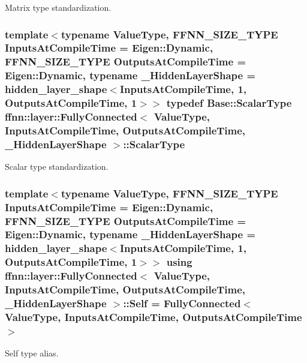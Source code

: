 Matrix type standardization. 

\hypertarget{classffnn_1_1layer_1_1_fully_connected_aa5e1875ec3ea63c90655419e7dd32a55}{
\subsubsection[{Scalar\-Type}]{\setlength{\rightskip}{0pt plus 5cm}template$<$typename Value\-Type, F\-F\-N\-N\-\_\-\-S\-I\-Z\-E\-\_\-\-T\-Y\-P\-E Inputs\-At\-Compile\-Time = Eigen\-::\-Dynamic, F\-F\-N\-N\-\_\-\-S\-I\-Z\-E\-\_\-\-T\-Y\-P\-E Outputs\-At\-Compile\-Time = Eigen\-::\-Dynamic, typename \-\_\-\-Hidden\-Layer\-Shape = hidden\-\_\-layer\-\_\-shape$<$\-Inputs\-At\-Compile\-Time, 1, Outputs\-At\-Compile\-Time, 1$>$$>$ typedef {\bf Base\-::\-Scalar\-Type} {\bf ffnn\-::layer\-::\-Fully\-Connected}$<$ Value\-Type, Inputs\-At\-Compile\-Time, Outputs\-At\-Compile\-Time, \-\_\-\-Hidden\-Layer\-Shape $>$\-::{\bf Scalar\-Type}}}\label{classffnn_1_1layer_1_1_fully_connected_aa5e1875ec3ea63c90655419e7dd32a55}


Scalar type standardization. 

\hypertarget{classffnn_1_1layer_1_1_fully_connected_ac41b1867a1a4e8c9c9eaa892db2ab805}{
\subsubsection[{Self}]{\setlength{\rightskip}{0pt plus 5cm}template$<$typename Value\-Type, F\-F\-N\-N\-\_\-\-S\-I\-Z\-E\-\_\-\-T\-Y\-P\-E Inputs\-At\-Compile\-Time = Eigen\-::\-Dynamic, F\-F\-N\-N\-\_\-\-S\-I\-Z\-E\-\_\-\-T\-Y\-P\-E Outputs\-At\-Compile\-Time = Eigen\-::\-Dynamic, typename \-\_\-\-Hidden\-Layer\-Shape = hidden\-\_\-layer\-\_\-shape$<$\-Inputs\-At\-Compile\-Time, 1, Outputs\-At\-Compile\-Time, 1$>$$>$ using {\bf ffnn\-::layer\-::\-Fully\-Connected}$<$ Value\-Type, Inputs\-At\-Compile\-Time, Outputs\-At\-Compile\-Time, \-\_\-\-Hidden\-Layer\-Shape $>$\-::{\bf Self} =  {\bf Fully\-Connected}$<$Value\-Type, Inputs\-At\-Compile\-Time, Outputs\-At\-Compile\-Time$>$}}\label{classffnn_1_1layer_1_1_fully_connected_ac41b1867a1a4e8c9c9eaa892db2ab805}


Self type alias. 


